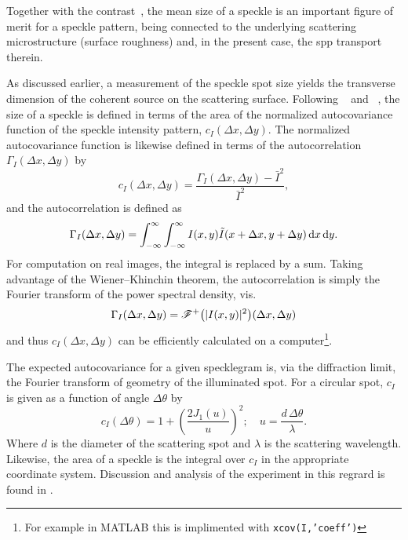 Together with the contrast~\cite{goodman1975dependence}, the mean size of a
speckle is an important figure of merit for a speckle pattern, being connected
to the underlying scattering microstructure (surface roughness) and, in the
present case, the \gls{spp} transport therein.

As discussed earlier, a measurement of the speckle spot
size yields the transverse dimension of the coherent source
on the scattering surface.
Following ~\cite{goodman1975statistical} and
~\cite{dainty1975laser}, the size of a speckle is defined in
terms of the area of the normalized autocovariance function of the speckle
intensity pattern, $c_I(\Delta x, \Delta y)$.  The normalized autocovariance
function is likewise defined in terms of the autocorrelation $\Gamma_I(\Delta
x, \Delta y)$ by
\begin{equation}
c_I(\Delta x, \Delta y) = \frac{\Gamma_I(\Delta x, \Delta y) - \bar{I}^2}{\bar{I}^2},
\label{eqn:normxcov}
\end{equation}
and the autocorrelation is defined as
\begin{equation}
\Gamma_I(\Delta x, \Delta y) = \int_{-\infty}^{\infty}\int_{-\infty}^{\infty} I(x,y) \tilde{I}(x+\Delta x,y+\Delta y) \,\mathrm{d} x \,\mathrm{d} y.
\end{equation}
For computation on real images, the integral is replaced by a sum.  Taking
advantage of the Wiener–Khinchin theorem, the autocorrelation is simply the
Fourier transform of the power spectral density, vis.
\begin{equation}
\Gamma_I(\Delta x, \Delta y) = {\mathscr{F}^{+}\bigl(|I(x,y)|^2\bigr)}(\Delta x, \Delta y)
\end{equation}
and thus  $c_I(\Delta x, \Delta y)$ can be efficiently calculated on a
computer\footnote{For example in MATLAB this is implimented with
\texttt{xcov(I,'coeff')}}.

The expected autocovariance for a given specklegram is, via the diffraction
limit, the Fourier transform of geometry of the illuminated spot.  For a
circular spot, $c_I$ is given as a function of angle $\Delta \theta$ by
\begin{equation}
c_I{\left(\Delta \theta\right)} = 1 + {\left(\frac{2 J_1(u)}{u}\right)}^2;\quad
u=\frac{d\, \Delta\theta}{\lambda}.
\label{eqn:angularsize}
\end{equation}
Where $d$ is the diameter of the scattering spot and $\lambda$ is the
scattering wavelength.  Likewise, the area of a speckle is the integral over
$c_I$ in the appropriate coordinate system.  Discussion and analysis of the
experiment in this regrard is found in .

